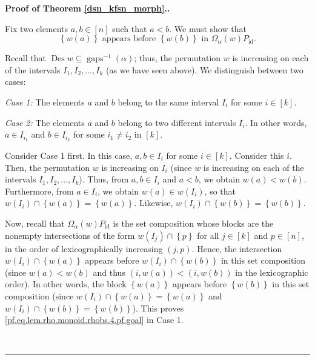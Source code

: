 \documentclass[12pt]{article}
\theoremstyle{definition}%
\theoremstyle{definition}%
\theoremstyle{remark}%
\newcommand{\tup}[1]{\left( #1 \right)}
\newcommand{\interval}[1]{\left[ #1 \right]} %
\newcommand{\set}[1]{\left\{ #1 \right\}}
\newcommand{\Omal}{\Omega_{\alpha}}
\newcommand{\Des}{\operatorname{Des}}
\newcommand{\gaps}{\operatorname{gaps}}
\newcommand{\id}{\operatorname{id}}
\newenvironment{proof}[1][Proof]{\noindent\textbf{#1.} }{\ \rule{0.5em}{0.5em}}
\begin{document}
\begin{proof}[Proof of Theorem \ref{dsn_kfsn_morph}.]
\begin{enumerate}
Fix two elements $a,b\in\interval{n}$ such that $a<b$. We must show
that
\begin{equation}
\set{w\tup{a}}  \text{ appears before }
\set{w\tup{b}}  \text{ in }\Omal \tup{w}
P_{\id}.
\label{pf.eq.lem.rho.monoid.rhobs.4.pf.goal}
\end{equation}


Recall that $\Des w \subseteq \gaps^{-1} \tup{\alpha}$;
thus, the permutation $w$ is increasing on each of
the intervals $I_{1},I_{2},\ldots,I_{k}$ (as we have seen above). We
distinguish between two cases:

\textit{Case 1:} The elements $a$ and $b$ belong to the same interval $I_{i}$
for some $i\in\interval{k}$.

\textit{Case 2:} The elements $a$ and $b$ belong to two different intervals
$I_{i}$. In other words, $a\in I_{i_{1}}$ and $b\in I_{i_{2}}$ for some
$i_{1}\neq i_{2}$ in $\interval{k}$.

Consider Case 1 first. In this case, $a,b\in I_{i}$ for some $i\in
\interval{k}$. Consider this $i$. Then, the permutation $w$ is increasing on
$I_{i}$ (since $w$ is increasing on each of the intervals $I_{1},I_{2},
\ldots,I_{k}$). Thus, from $a,b\in I_{i}$ and $a<b$, we obtain $w\left(
a\right)  <w\tup{b} $. Furthermore, from $a\in I_{i}$, we obtain
$w\tup{a}   \in w\left(  I_{i}\right)$, so that
$w \tup{I_i} \cap \set{w\tup{a}} = \set{w\tup{a}}$.
Likewise,
$w \tup{I_i} \cap \set{w\tup{b}} = \set{w\tup{b}}$.

Now, recall that $\Omal \tup{w}  P_{\id}$ is
the set composition whose blocks are the nonempty intersections of the form
$w\left(  I_{j}\right)  \cap \set{p}$ for all $j\in
\interval{k}$ and $p\in\interval{n}$, in the order of lexicographically
increasing $\tup{j, p}$.
Hence, the intersection $w\left(
I_{i}\right)  \cap\set{w\tup{a}}$ appears before
$w\left(  I_{i}\right)  \cap\set{w\tup{b}}$ in this
set composition (since $w\tup{a}   <w\tup{b} $ and thus
$\tup{i, w\tup{a}} < \tup{i, w\tup{b}}$ in the
lexicographic order).
In other words, the block $\set{w\tup{a}}$ appears before
$\set{w\tup{b}}$ in this set composition
(since $w \tup{I_i} \cap \set{w\tup{a}} = \set{w\tup{a}}$
and $w \tup{I_i} \cap \set{w\tup{b}} = \set{w\tup{b}}$).
This proves
\eqref{pf.eq.lem.rho.monoid.rhobs.4.pf.goal} in Case 1.


\end{enumerate}
\end{proof}
\end{document}
